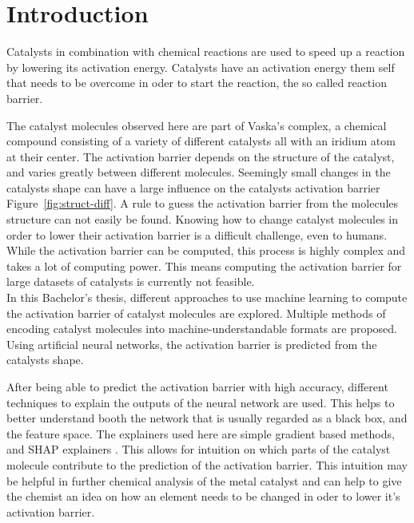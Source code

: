 
\chapter{Introduction}
\label{ch:Introduction}


Catalysts in combination with chemical reactions are used to speed up a reaction by lowering its activation energy. 
Catalysts have an activation energy them self that needs to be overcome in oder to start the reaction, the so called reaction barrier.

The catalyst molecules observed here are part of Vaska's complex, a chemical compound consisting of a variety of different catalysts all with an iridium atom at their center.
The activation barrier depends on the structure of the catalyst, and varies greatly between different molecules.
Seemingly small changes in the catalysts shape can have a large influence on the catalysts activation barrier Figure~\ref{fig:struct-diff}.
A rule to guess the activation barrier from the molecules structure can not easily be found.  
Knowing how to change catalyst molecules in order to lower their activation barrier is a difficult challenge, even to humans.
While the activation barrier can be computed, this process is highly complex and takes a lot of computing power.
This means computing the activation barrier for large datasets of catalysts is currently not feasible.
\\
In this Bachelor's thesis, different approaches to use machine learning to compute the activation barrier of catalyst molecules are explored.
Multiple methods of encoding catalyst molecules into machine-understandable formats are proposed.
Using artificial neural networks, the activation barrier is predicted from the catalysts shape.

After being able to predict the activation barrier with high accuracy, different techniques to explain the 
outputs of the neural network are used.
This helps to better understand booth the network that is usually regarded as a black box, and the feature space.
The explainers used here are simple gradient based methods, and SHAP explainers \cite{NIPS2017_7062}.
This allows for intuition on which parts of the catalyst molecule contribute to the prediction of the activation barrier.
This intuition may be helpful in further chemical analysis of the metal catalyst and can help to give the 
chemist an idea on how an element needs to be changed in oder to lower it's activation barrier.
\\

